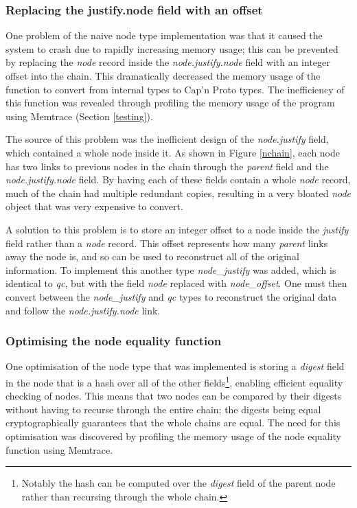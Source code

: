\subsubsection{Replacing the justify.node field with an offset}
One problem of the naive node type implementation was that it caused the system to crash due to rapidly increasing memory usage; this can be prevented by replacing the \textit{node} record inside the \textit{node.justify.node} field with an integer offset into the chain. This dramatically decreased the memory usage of the function to convert from internal types to Cap'n Proto types. The inefficiency of this function was revealed through profiling the memory usage of the program using Memtrace  (Section \ref{testing}).

The source of this problem was the inefficient design of the \textit{node.justify} field, which contained a whole node inside it. As shown in Figure \ref{nchain}, each node has two links to previous nodes in the chain through the \textit{parent} field and the \textit{node.justify.node} field. By having each of these fields contain a whole \textit{node} record, much of the chain had multiple redundant copies, resulting in a very bloated \textit{node} object that was very expensive to convert.

A solution to this problem is to store an integer offset to a node inside the \textit{justify} field rather than a \textit{node} record. This offset represents how many \textit{parent} links away the node is, and so can be used to reconstruct all of the original information. To implement this another type \textit{node\_justify} was added, which is identical to \textit{qc}, but with the field \textit{node} replaced with \textit{node\_offset}. One must then convert between the \textit{node\_justify} and \textit{qc} types to reconstruct the original data and follow the \textit{node.justify.node} link.

\subsubsection{Optimising the node equality function} \label{equality}
One optimisation of the node type that was implemented is storing a \textit{digest} field in the node that is a hash over all of the other fields\footnote{Notably the hash can be computed over the \textit{digest} field of the parent node rather than recursing through the whole chain.}, enabling efficient equality checking of nodes. This means that two nodes can be compared by their digests without having to recurse through the entire chain; the digests being equal cryptographically guarantees that the whole chains are equal. The need for this optimisation was discovered by profiling the memory usage of the node equality function using Memtrace.


